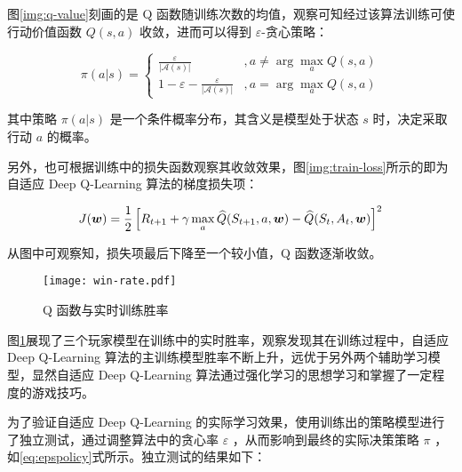 图\ref{img:q-value}刻画的是 Q 函数随训练次数的均值，观察可知经过该算法训练可使行动价值函数 $Q(s,a)$ 收敛，进而可以得到 $\varepsilon$-贪心策略：

\begin{equation}\label{eq:epspolicy}
    \pi(a|s)=
    \begin{cases}
        \frac{\varepsilon}{|\mathcal A(s)|}&, a\neq\arg\max_aQ(s,a)\\
        1-\varepsilon-\frac{\varepsilon}{|\mathcal A(s)|}&, a=\arg\max_aQ(s,a)
    \end{cases}
\end{equation}

其中策略 $\pi(a|s)$ 是一个条件概率分布，其含义是模型处于状态 $s$ 时，决定采取行动 $a$ 的概率。

另外，也可根据训练中的损失函数观察其收敛效果，图\ref{img:train-loss}所示的即为 自适应 Deep Q-Learning 算法的梯度损失项：

\begin{equation}
    \centering
    J(\boldsymbol{w}) = \frac{1}{2}\left[R_{t+1}+\gamma\max_a\widehat{Q}(S_{t+1},a,\boldsymbol{w})-\widehat{Q}(S_t,A_t,\boldsymbol{w})\right]^2
\end{equation}

从图中可观察知，损失项最后下降至一个较小值，Q 函数逐渐收敛。

\begin{figure}[H]
    \centering
    \texttt{[image: win-rate.pdf]}
    \caption{Q 函数与实时训练胜率}\label{img:win-rate}
\end{figure}

图\ref{img:win-rate}展现了三个玩家模型在训练中的实时胜率，观察发现其在训练过程中，自适应 Deep Q-Learning 算法的主训练模型胜率不断上升，远优于另外两个辅助学习模型，显然自适应 Deep Q-Learning 算法通过强化学习的思想学习和掌握了一定程度的游戏技巧。

为了验证自适应 Deep Q-Learning 的实际学习效果，使用训练出的策略模型进行了独立测试，通过调整算法中的贪心率 $\varepsilon$ ，从而影响到最终的实际决策策略 $\pi$ ，如\ref{eq:epspolicy}式所示。独立测试的结果如下：

